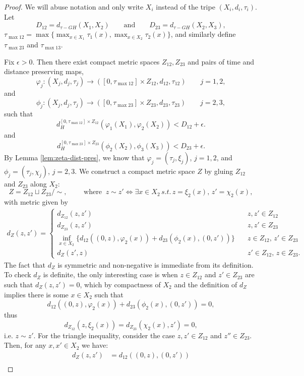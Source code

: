 \documentclass[a4paper,12pt,reqno]{amsart}
\theoremstyle{plain}
\newcommand{\be}{\begin{equation}}
\newcommand{\ee}{\end{equation}}
\newcommand{\disjointunion}{\sqcup}
\def\iff{\Longleftrightarrow}
\begin{document}
\begin{proof}
We will abuse notation and only write $X_i$ instead of the tripe $(X_i,d_i, \tau_i)$.
Let 
\be\label{eq-distij}
D_{12}=d_{\tau-GH}(X_1, X_2) \qquad \text{and}\qquad 
D_{23}=d_{\tau-GH}(X_2, X_3),
\ee
$\tau_{\max 12}=\max \{ \max_{x\in X_1}\tau_1(x), \max_{x \in X_2}\tau_2(x)\}$, 
and similarly define $\tau_{\max 23}$ and $\tau_{\max 13}$. 

Fix $\epsilon>0$. Then there exist compact metric spaces $Z_{12}, Z_{23}$ and pairs of time and distance preserving maps,
\be
\varphi_j:(X_j,d_j,\tau_j)\to
([0,\tau_{\max 12}]\times Z_{12}, d_{12}, \tau_{12}) \qquad j=1,2,
\ee
and 
\be
\phi_j:(X_j,d_j,\tau_j)\to
([0,\tau_{\max 23}]\times Z_{23}, d_{23}, \tau_{23}) \qquad j=2,3,
\ee  
such that
\be
d_H^{[0,\tau_{\max 12}]\times Z_{12}}(\varphi_1(X_1),\varphi_2(X_2))
<D_{12}
+\epsilon.
\ee
and
\be
d_H^{[0,\tau_{\max 23}]\times Z_{23}}(\phi_2(X_2),\phi_3(X_3))
<D_{23}+\epsilon.
\ee
By Lemma 
\ref{lem:zeta-dist-pres}, we know that $\varphi_j=(\tau_j, \xi_j)$, $j=1,2$, 
and $\phi_j=(\tau_j, \chi_j)$, $j=2,3$. 
We construct a compact metric space $Z$ by gluing $Z_{12}$ and $Z_{23}$ along 
$X_2$:
\be
Z= Z_{12} \disjointunion Z_{23}/ \sim, \qquad \text{ where }\ z \sim z' \iff  {\exists x\in X_2 \,s.t.\, z=\xi_2(x),\, z'=\chi_2(x)},
\ee
with metric given by
\begin{align}
d_Z(z,z')= 
\begin{cases}
   d_{Z_{12}}(z, z') & \quad z,z' \in Z_{12}\\
    d_{Z_{23}}(z, z') & \quad z,z' \in Z_{23}\\
   \inf_{x \in X_2}\{ d_{12}((0,z), \varphi_2(x)) + d_{23}(\phi_2(x),(0,z'))\} & \quad z \in Z_{12}, \, z'\in Z_{23}\\
d_Z (z',z) & \quad z' \in Z_{12}, \, z\in Z_{23}.
\end{cases}
\end{align}
The fact that $d_Z$ is symmetric and non-negative is immediate from its definition. To check $d_Z$ is definite, the only interesting case is when $z\in Z_{12}$ and $z'\in Z_{23}$ are such that $d_Z(z,z')=0$, which by compactness of $X_2$ and the definition of $d_Z$ implies there is some $x\in X_2$ such that
\[
d_{12}((0,z), \varphi_2(x)) + d_{23}(\phi_2(x),(0,z')) = 0,
\]
thus
\[
d_{Z_{12}}(z,\xi_2(x)) = d_{Z_{23}}(\chi_2(x),z') = 0, 
\]
i.e. $z\sim z'$. For the triangle inequality, consider the case $z,z'\in Z_{12}$ and $z''\in Z_{23}$. Then, for any $x,x'\in X_2$ we have:
\begin{align*}
d_Z(z,z') &= d_{12}((0,z),(0,z')) \\

\end{align*}
\end{proof}
\end{document}
